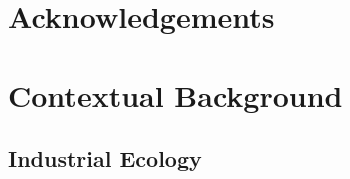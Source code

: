 \documentclass[ %
                    author={Tom Jager},
                supervisor={Dr. Daniel Schien},
                    degree={MEng},
                     title={A Bayesian Inference Engine for UMIS Structured Data},
                  subtitle={},
                      type={research},
                      year={2019} ]{dissertation}
\begin{document}
\chapter*{Acknowledgements}

%

\mainmatter


\chapter{Contextual Background}
\label{chap:context}

\noindent
\section{Industrial Ecology}
\end{document}

